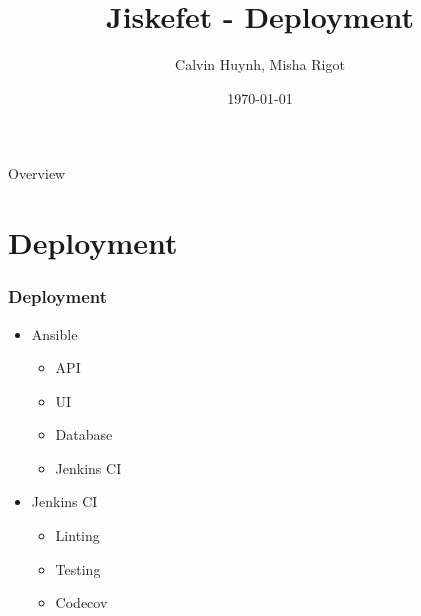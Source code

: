 \documentclass[12pt]{beamer}
\title{Jiskefet - Deployment}
\author{Calvin Huynh, Misha Rigot}
\date{\today}
\begin{document}
	\begin{frame}
	\titlepage
	\end{frame}

	\begin{frame}{Overview}
		\tableofcontents
	\end{frame}

	\section{Deployment}
	\begin{frame}
        \frametitle{Deployment}
		\begin{itemize}
			\item Ansible
			\begin{itemize}
                \item API
                \item UI
                \item Database
                \item Jenkins CI
            \end{itemize} 
			\item Jenkins CI
            \begin{itemize}
                \item Linting
                \item Testing
                \item Codecov
            \end{itemize}
		\end{itemize}
    \end{frame}
\end{document}
